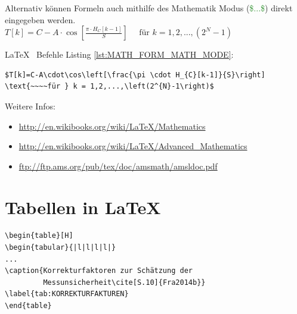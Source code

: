 \documentclass[SSS_Laborbericht.tex]{subfiles}
\begin{document}
Alternativ können Formeln auch mithilfe des Mathematik Modus (\textcolor{ForestGreen}{\$...\$}) direkt eingegeben werden.\linebreak
$T[k]=C-A\cdot\cos\left[\frac{\pi \cdot H_{C}[k-1]}{S}\right]    \text{~~~~für } k = 1,2,...,\left(2^{N}-1\right)$
\newpage

\LaTeX ~ Befehle Listing \ref{lst:MATH_FORM_MATH_MODE}:
\begin{lstlisting}[style=LATEX, frame=single, caption=Mathematikmodus \LaTeX, captionpos=b, label=lst:MATH_FORM_MATH_MODE, numbers=none]
$T[k]=C-A\cdot\cos\left[\frac{\pi \cdot H_{C}[k-1]}{S}\right]    \text{~~~~für } k = 1,2,...,\left(2^{N}-1\right)$
\end{lstlisting}
Weitere Infos:
\begin{itemize}
  \item \href{http://en.wikibooks.org/wiki/LaTeX/Mathematics}{http://en.wikibooks.org/wiki/LaTeX/Mathematics}
  \item \href{http://en.wikibooks.org/wiki/LaTeX/Advanced\_Mathematics}{http://en.wikibooks.org/wiki/LaTeX/Advanced\_Mathematics} 
  \item \href{ftp://ftp.ams.org/pub/tex/doc/amsmath/amsldoc.pdf}{ftp://ftp.ams.org/pub/tex/doc/amsmath/amsldoc.pdf}
\end{itemize}
\newpage

\section{Tabellen in \LaTeX}

\begin{lstlisting}[style=LATEX, frame=single, caption=\LaTeX ~Tabellen Prototyp, captionpos=b, label=lst:MATH_FORM, numbers=none]
\begin{table}[H]
\begin{tabular}{|l|l|l|l|}
...
\caption{Korrekturfaktoren zur Schätzung der 
         Messunsicherheit\cite[S.10]{Fra2014b}}
\label{tab:KORREKTURFAKTUREN}
\end{table}
\end{lstlisting}
~
\end{document}
